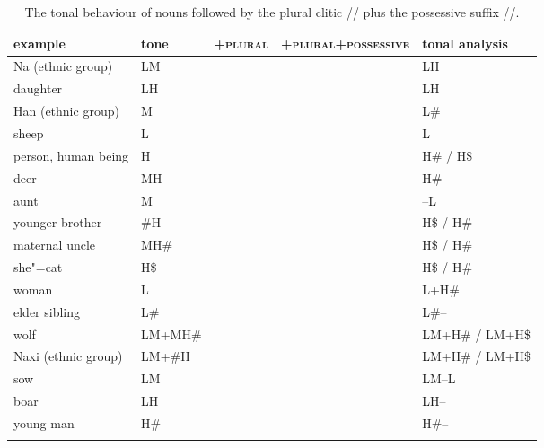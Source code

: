 \begin{sidewaystable}[p]
\caption{\label{tab:thetonalbehaviourofplural}The tonal behaviour of nouns followed by the {plural} clitic // plus the {possessive} suffix //.}
\begin{tabularx}{\textwidth}{ l l l Q l }
\lsptoprule
	example & tone & +\textsc{plural} & +\textsc{plural}+\textsc{possessive} & tonal analysis\\ \midrule
	Na (ethnic group) & LM &  &  & LH\\
	daughter & LH &  &  & LH\\
	Han (ethnic group) & M &  &  & L\#\\
	sheep & L &  &  & L\\
	person, human being & H &  &  & H\# / H\$\\
	deer & MH &  &  & H\#\\ \addlinespace \hdashline \addlinespace
	aunt & M &  &  & --L\\
	younger brother & \#H &  &  & H\$ / H\#\\
	maternal uncle & MH\# &  &  & H\$ / H\#\\
	she"=cat & H\$ &  &  & H\$ / H\#\\
	woman & L &  &  & L+H\#\\
	elder sibling & L\# &  &  & L\#--\\
	wolf & LM+MH\# &  &  & LM+H\# / LM+H\$\\
	Naxi (ethnic group) & LM+\#H &  &  & LM+H\# / LM+H\$\\
	sow & LM &  &  & LM--L\\
	boar & LH &  &  & LH--\\
	young man & H\# &  &  & H\#--\\
\lspbottomrule
\end{tabularx}
\end{sidewaystable}


